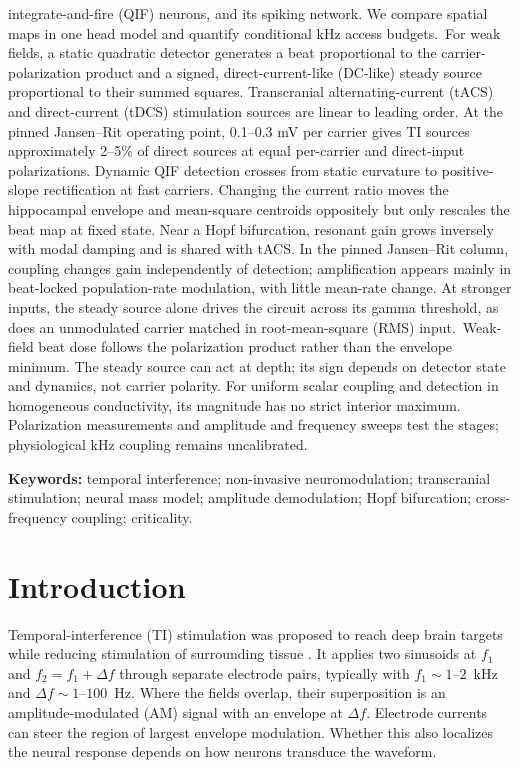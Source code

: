 \documentclass[11pt,a4paper]{article}
\begin{document}
integrate-and-fire (QIF) neurons, and its spiking network. We compare spatial maps in
one head model and quantify conditional kHz access budgets.\ For weak fields, a static quadratic detector generates a beat proportional to the
carrier-polarization product and a signed, direct-current-like (DC-like) steady source
proportional to their summed squares. Transcranial alternating-current (tACS) and direct-current (tDCS)
stimulation sources are linear to leading order. At the pinned
Jansen--Rit operating point, 0.1--0.3 mV per carrier gives TI sources approximately
2--5\% of direct sources at equal per-carrier and direct-input
polarizations. Dynamic QIF detection crosses from static curvature to positive-slope
rectification at fast carriers. Changing the current ratio moves the hippocampal
envelope and mean-square centroids oppositely but only rescales the beat map at
fixed state. Near a Hopf bifurcation, resonant gain grows inversely with modal damping
and is shared with tACS. In the pinned Jansen--Rit column, coupling changes gain
independently of detection; amplification appears mainly in beat-locked population-rate
modulation, with little mean-rate change. At stronger inputs, the steady source alone drives the circuit across its gamma
threshold, as does an unmodulated carrier matched in root-mean-square (RMS) input.\ Weak-field beat dose follows the polarization product rather than the envelope minimum.
The steady source can act at depth; its sign depends on detector state and dynamics,
not carrier polarity. For uniform scalar coupling and detection in homogeneous
conductivity, its magnitude has no strict interior maximum. Polarization measurements and amplitude and frequency sweeps test the
stages; physiological kHz coupling remains uncalibrated.
\fi

\smallskip
\noindent\textbf{Keywords:} temporal interference; non-invasive neuromodulation;
transcranial stimulation; neural mass model; amplitude demodulation; Hopf bifurcation;
cross-frequency coupling; criticality.

\clearpage
\tableofcontents
\clearpage

\section{Introduction}
Temporal-interference (TI) stimulation was proposed to reach deep brain targets while
reducing stimulation of surrounding tissue \cite{grossman2017}. It applies two sinusoids at
$f_1$ and $f_2=f_1+\Delta f$ through separate electrode pairs, typically with
$f_1\sim1$--$2$~kHz and $\Delta f\sim1$--$100$~Hz. Where the fields overlap, their
superposition is an amplitude-modulated (AM) signal with an envelope at $\Delta f$.
Electrode currents can steer the region of largest envelope modulation. Whether this
also localizes the neural response depends on how neurons transduce the waveform.
\end{document}
